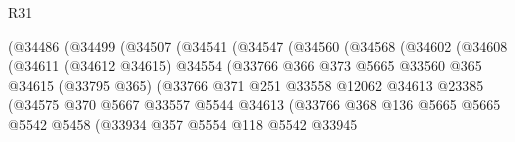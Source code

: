 \begin{lexlean}{R31}
\begin{coremodule}
                            (@34486
                              (@34499
                                (@34507
                                  (@34541
                                    (@34547
                                      (@34560
                                        (@34568
                                          (@34602
                                            (@34608
                                              (@34611
                                                (@34612 @34615)
                                                @34554
                                                (@33766
                                                  @366
                                                  @373
                                                  @5665
                                                  @33560
                                                  @365
                                                  @34615
                                                  (@33795 @365)
                                                  (@33766
                                                    @371
                                                    @251
                                                    @33558
                                                    @12062
                                                    @34613
                                                    @23385
                                                    (@34575
                                                      @370
                                                      @5667
                                                      @33557
                                                      @5544
                                                      @34613
                                                      (@33766
                                                        @368
                                                        @136
                                                        @5665
                                                        @5665
                                                        @5542
                                                        @5458
                                                        (@33934
                                                          @357
                                                          @5554
                                                          @118
                                                          @5542
                                                          @33945

\end{coremodule}
\end{lexlean}

